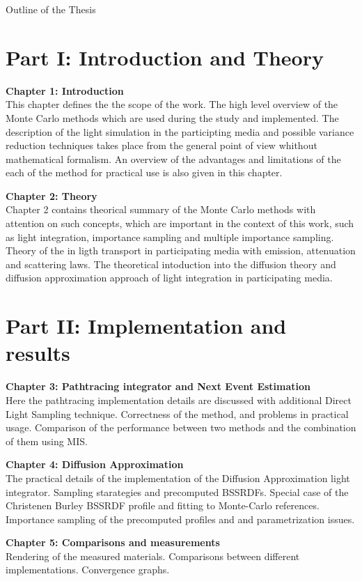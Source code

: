 \newpage

{}

\begin{center}
	\huge{Outline of the Thesis}
\end{center}

\section*{Part I: Introduction and Theory}

\textbf{ Chapter 1: Introduction}\\
This chapter defines the the scope of the work. The high level
overview of the Monte Carlo methods which are used during the study and
implemented.
The description of the light simulation in the participting media and possible
variance reduction techniques takes place from the general point of view
whithout mathematical formalism. An overview of the advantages and limitations
of the each of the method for practical use is also given in this chapter.

\textbf{Chapter 2: Theory}\\
Chapter 2 contains theorical summary of the Monte Carlo methods with attention
on such concepts, which are important in the context of this work, such
as light integration, importance sampling and multiple importance sampling.
Theory of the in ligth transport in participating media with emission,
attenuation and scattering laws.
The theoretical intoduction into the diffusion theory and diffusion
approximation approach of light integration in participating media.

\section*{Part II: Implementation and results}

\textbf{ Chapter 3: Pathtracing integrator and Next Event Estimation}\\
Here the pathtracing implementation details are discussed with additional Direct
Light Sampling technique. Correctness of the method, and
problems in practical usage. Comparison of the performance between two methods
and the combination of them using MIS.

\textbf{ Chapter 4: Diffusion Approximation}\\
The practical details of the implementation of the Diffusion Approximation
light integrator. Sampling starategies and precomputed BSSRDFs. Special case of
the Christenen Burley BSSRDF profile and fitting to Monte-Carlo references.
Importance sampling of the precomputed profiles and and parametrization issues.


\textbf{ Chapter 5: Comparisons and measurements}\\
Rendering of the measured materials. Comparisons between different
implementations. Convergence graphs. 
